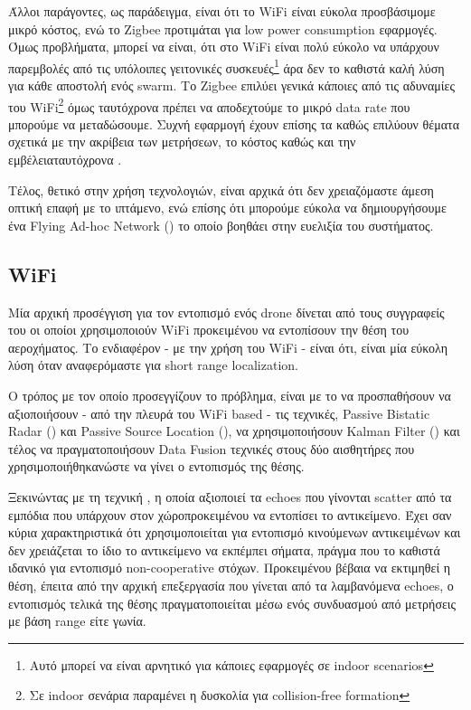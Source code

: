 Άλλοι παράγοντες, ως παράδειγμα, είναι ότι το WiFi είναι εύκολα προσβάσιμο\udot με μικρό κόστος, ενώ το Zigbee προτιμάται για low power consumption εφαρμογές. Όμως προβλήματα, μπορεί να είναι, ότι στο WiFi είναι πολύ εύκολο να υπάρχουν παρεμβολές από τις υπόλοιπες γειτονικές 
συσκευές\footnote{Αυτό μπορεί να είναι αρνητικό για κάποιες εφαρμογές σε indoor scenarios} 
άρα δεν το καθιστά καλή λύση για κάθε αποστολή ενός swarm. Το Zigbee επιλύει γενικά κάποιες από τις αδυναμίες του WiFi\footnote{Σε indoor σενάρια παραμένει η δυσκολία για collision-free formation} όμως ταυτόχρονα πρέπει να αποδεχτούμε το μικρό data rate που μπορούμε να μεταδώσουμε. 
Συχνή εφαρμογή έχουν επίσης τα  καθώς επιλύουν θέματα σχετικά με την ακρίβεια των μετρήσεων, 
το κόστος καθώς και την εμβέλεια\udot ταυτόχρονα \cite{uwb-imu-gps3}. 

Τέλος, θετικό στην χρήση  τεχνολογιών, είναι αρχικά ότι δεν χρειαζόμαστε άμεση οπτική επαφή με το ιπτάμενο, ενώ επίσης ότι μπορούμε εύκολα να δημιουργήσουμε
ένα Flying Ad-hoc Network () το οποίο βοηθάει στην ευελιξία του συστήματος.

\subsection{WiFi}
Μία αρχική προσέγγιση για τον εντοπισμό ενός drone δίνεται από τους συγγραφείς του \cite{wifi-passive-active-drone-localization}
οι οποίοι χρησιμοποιούν WiFi προκειμένου να εντοπίσουν την θέση του αεροχήματος. Το ενδιαφέρον - με την χρήση του WiFi - είναι ότι, 
είναι μία εύκολη λύση όταν αναφερόμαστε για short range localization. 

Ο τρόπος με τον οποίο προσεγγίζουν το πρόβλημα, είναι με 
το να προσπαθήσουν να αξιοποιήσουν - από την πλευρά του WiFi based - τις τεχνικές, 
Passive Bistatic Radar () και Passive Source Location (), να χρησιμοποιήσουν Kalman Filter ()
και τέλος να πραγματοποιήσουν Data Fusion τεχνικές στους δύο αισθητήρες που χρησιμοποιήθηκαν\udot ώστε να γίνει ο εντοπισμός της θέσης.

Ξεκινώντας με τη τεχνική , η οποία αξιοποιεί τα echoes που
γίνονται scatter από τα εμπόδια που υπάρχουν στον χώρο\udot προκειμένου να εντοπίσει το αντικείμενο. Έχει σαν κύρια χαρακτηριστικά 
ότι χρησιμοποιείται για εντοπισμό κινούμενων αντικειμένων και δεν χρειάζεται το ίδιο το αντικείμενο να εκπέμπει σήματα, πράγμα που 
το καθιστά ιδανικό για εντοπισμό non-cooperative στόχων. Προκειμένου βέβαια να εκτιμηθεί η θέση, έπειτα από την αρχική επεξεργασία 
που γίνεται από τα λαμβανόμενα echoes, ο εντοπισμός τελικά της θέσης πραγματοποιείται μέσω ενός συνδυασμού από μετρήσεις με βάση 
range είτε γωνία. 

